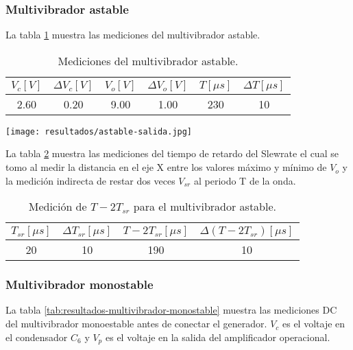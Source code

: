 \FloatBarrier
\subsubsection{Multivibrador astable}

La tabla \ref{tab:resultados-multivibrador-astable} muestra las mediciones del multivibrador astable.

\begin{table}[ht]
\centering
\begin{tabular}{|c|c|c|c|c|c|}
\hline
\(V_c [V]\) & \(\Delta V_c [V]\) & \(V_o [V]\) & \(\Delta V_o [V]\) & \(T [\mu s]\) & \(\Delta T [\mu s]\) \\ \hline
2.60 & 0.20 & 9.00 & 1.00 & 230 & 10  \\ \hline
\end{tabular}
\caption{Mediciones del multivibrador astable.}
\label{tab:resultados-multivibrador-astable}
\end{table}

\begin{ilustracion}[ht]
    \centering
    \texttt{[image: resultados/astable-salida.jpg]}
    \caption{Medición de voltajes del multivibrador astable (canal 1 $V_o$, canal 2 $V_c$).}
    \label{fig:multivibrador-astable-salida}
\end{ilustracion}

La tabla \ref{tab:calculo-t-2tsr} muestra las mediciones del tiempo de retardo del Slewrate el cual se tomo al medir la distancia en el eje X entre los valores máximo y mínimo de $V_o$ y la medición indirecta de restar dos veces $V_{sr}$ al periodo T de la onda.

\begin{table}[ht]
\centering
\begin{tabular}{|c|c|c|c|}
\hline
\(T_{sr} [\mu s]\) & \(\Delta T_{sr} [\mu s]\) & \(T - 2T_{sr} [\mu s]\) & \(\Delta (T - 2T_{sr}) [\mu s]\) \\ \hline
20 & 10 & 190 & 10 \\ \hline
\end{tabular}
\caption{Medición de \(T - 2T_{sr}\) para el multivibrador astable.}
\label{tab:calculo-t-2tsr}
\end{table}

\subsubsection{Multivibrador monostable}

La tabla \ref{tab:resultados-multivibrador-monostable} muestra las mediciones DC del multivibrador monoestable antes de conectar el generador. $V_c$ es el voltaje en el condensador $C_6$ y $V_p$ es el voltaje en la salida del amplificador operacional.

